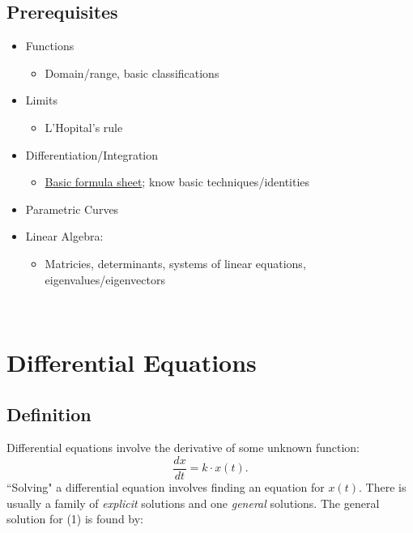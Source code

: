 \documentclass{article}
\begin{document}
\subsection{Prerequisites}
\begin{itemize}
\item Functions
\begin{itemize}
\item Domain/range, basic classifications
\end{itemize}
\item Limits
\begin{itemize}
\item L'Hopital's rule
\end{itemize}
\item Differentiation/Integration
\begin{itemize}
\item \href{https://sites.math.rutgers.edu/\~shtelen/Teaching/FS.pdf}{Basic formula sheet}; know basic techniques/identities
\end{itemize}
\item Parametric Curves
\item Linear Algebra:
\begin{itemize}
\item Matricies, determinants, systems of linear equations, eigenvalues/eigenvectors
\end{itemize}
\end{itemize}

\
\newpage
\hline
\section{Differential Equations}
\subsection{Definition}

Differential equations involve the derivative of some unknown function:
\begin{equation}
\frac{dx}{dt} =k\cdot x( t) .
\end{equation}
``Solving" a differential equation involves finding an equation for $\displaystyle x( t)$. There is usually a family of \textit{explicit} solutions and one \textit{general} solutions. The general solution for (1) is found by:
        
 
\end{document}
